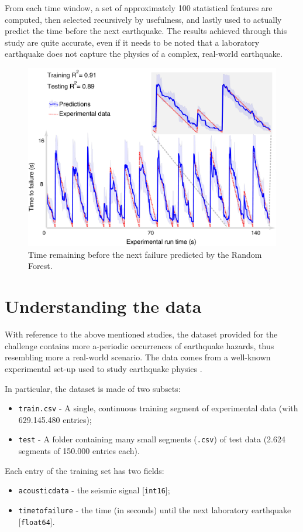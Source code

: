 From each time window, a set of approximately 100 statistical features are computed, then selected recursively by usefulness, and lastly used to actually predict the time before the next earthquake. The results achieved through this study are quite accurate, even if it needs to be noted that a laboratory earthquake does not capture the physics of a complex, real-world earthquake.

\begin{figure} [h]
	\centering
	\includegraphics[width=0.7\linewidth]{pictures/grl56367-fig-0002-m.jpg}
	\caption{Time remaining before the next failure predicted by the Random Forest.}
	\label{fig:RF2}
\end{figure}

\section{Understanding the data}
With reference to the above mentioned studies, the dataset provided for the challenge contains more a-periodic occurrences of earthquake hazards, thus resembling more a real-world scenario. The data comes from a well-known experimental set-up used to study earthquake physics \cite{challenge}.

In particular, the dataset is made of two subsets:
\begin{itemize}
	\item \texttt{train.csv} - A single, continuous training segment of experimental data (with 629.145.480 entries);
	\item \texttt{test} - A folder containing many small segments (\texttt{.csv}) of test data (2.624 segments of 150.000 entries each).
\end{itemize}

\noindent Each entry of the training set has two fields:
\begin{itemize}
	\item \texttt{acoustic\textunderscore data} - the seismic signal [\texttt{int16}];
	\item \texttt{time\textunderscore to\textunderscore failure} - the time (in seconds) until the next laboratory earthquake [\texttt{float64}].
\end{itemize}

